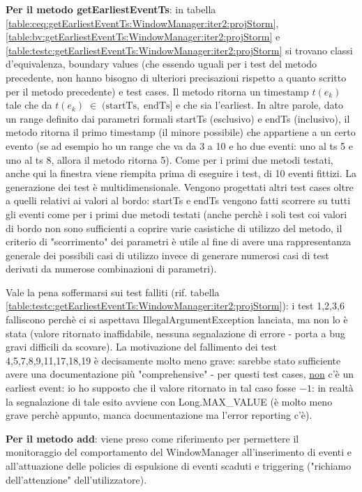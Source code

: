\documentclass[10pt, a4paper]{article}
\newcommand{\gettablelabel}[5]{table:#1:#2:#3:iter#4:proj#5}
\def\storm{Storm}
\begin{document}
	\textbf{Per il metodo getEarliestEventTs}: in tabella 
	\ref{\gettablelabel{ceq}{getEarliestEventTs}{WindowManager}{2}{\storm}},
	\ref{\gettablelabel{bv}{getEarliestEventTs}{WindowManager}{2}{\storm}} e
	\ref{\gettablelabel{testc}{getEarliestEventTs}{WindowManager}{2}{\storm}} si trovano
	classi d'equivalenza, boundary values 
	(che essendo uguali per i test del metodo precedente, non hanno bisogno di ulteriori precisazioni rispetto a 
	quanto scritto per il metodo precedente) e test cases. Il metodo ritorna un timestamp $t(e_k)$ tale che 
	da $t(e_k)\;\in\;(\text{startTs},\;\text{endTs}]$ e che sia l'earliest. In altre parole, dato un range 
	definito dai parametri formali startTs (esclusivo) e endTs (inclusivo), il metodo ritorna il primo timestamp
	(il minore possibile) che appartiene a un certo evento (se ad esempio ho un range che va da 3 a 10 e ho due
	eventi: uno al ts 5 e uno al ts 8, allora il metodo ritorna 5). Come per i primi due metodi testati, anche
	qui la finestra viene riempita prima di eseguire i test, di 10 eventi fittizi. La generazione dei test
	è multidimensionale. Vengono progettati altri test cases oltre a quelli relativi ai valori al bordo: 
	startTs e endTs vengono fatti scorrere su tutti gli eventi come per i primi due metodi testati (anche perchè
	i soli test coi valori di bordo non sono sufficienti a coprire varie casistiche di utilizzo del metodo,
	il criterio di "scorrimento" dei parametri è utile al fine di avere una rappresentanza generale dei possibili
	casi di utilizzo invece di generare numerosi casi di test derivati da numerose combinazioni di parametri).
	
	Vale la pena soffermarsi sui test falliti 
	(rif. tabella \ref{\gettablelabel{testc}{getEarliestEventTs}{WindowManager}{2}{\storm}}): 
	i test 1,2,3,6 falliscono perchè ci si aspettava
	IllegalArgumentException lanciata, ma non lo è stata (valore ritornato inaffidabile, nessuna segnalazione
	di errore - porta a bug gravi difficili da scovare). La motivazione del fallimento dei test 
	4,5,7,8,9,11,17,18,19 è decisamente molto meno grave: sarebbe stato sufficiente avere una documentazione più
	"comprehensive" - per questi test cases, \underline{non} c'è un earliest event: 
	io ho supposto che il valore ritornato in tal caso fosse $-1$: in realtà la segnalazione di tale esito avviene
	con Long.MAX\_VALUE (è molto meno grave perchè appunto, manca documentazione ma l'error reporting c'è).
	
	\textbf{Per il metodo add}: viene preso come riferimento per permettere il monitoraggio del comportamento
	del WindowManager all'inserimento di eventi e all'attuazione delle policies di espulsione di eventi scaduti
	e triggering ("richiamo dell'attenzione" dell'utilizzatore). 
	
\end{document}
